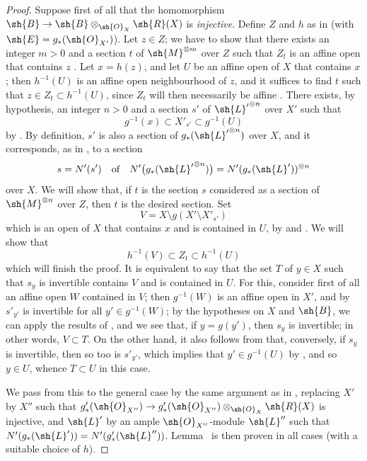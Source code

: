 \begin{proof}
Suppose first of all that the homomorphism $\sh{B}\to\sh{B}\otimes_{\sh{O}_X}\sh{R}(X)$ is \emph{injective}.
Define $Z$ and $h$ as in  (with $\sh{E}=g_*(\sh{O}_{X'})$).
Let $z\in Z$;
we have to show that there exists an integer $m>0$ and a section $t$ of $\sh{M}^{\otimes m}$ over $Z$ such that $Z_t$ is an affine open that contains $z$ .
Let $x=h(z)$, and let $U$ be an affine open of $X$ that contains $x$;
then $h^{-1}(U)$ is an affine open neighbourhood of $z$, and it suffices to find $t$ such that $z\in Z_t\subset h^{-1}(U)$, since $Z_t$ will then necessarily be affine .
There exists, by hypothesis, an integer $n>0$ and a section $s'$ of ${\sh{L}'}^{\otimes n}$ over $X'$ such that
\[
\label{II.6.6.9.1}
  g^{-1}(x) \subset X'_{s'} \subset g^{-1}(U)
\tag{6.6.9.1}
\]
by .
By definition, $s'$ is also a section of $g_*({\sh{L}'}^{\otimes n})$ over $X$, and it corresponds, as in , to a section
\[
  s=N'(s')
  \quad\text{of}\quad
  N'\bigl(g_*({\sh{L}'}^{\otimes n})\bigr)
  =N'(g_*(\sh{L}'))^{\otimes n}
\]
over $X$.
We will show that, if $t$ is the section $s$ considered as a section of $\sh{M}^{\otimes n}$ over $Z$, then $t$ is the desired section.
Set
\[
\label{II.6.6.9.2}
  V = X\setminus g(X'\setminus X'_{s'})
\tag{6.6.9.2}
\]
which is an open of $X$ that contains $x$ and is contained in $U$, by  and .
We will show that
\[
\label{II.6.6.9.3}
  h^{-1}(V) \subset Z_t \subset h^{-1}(U)
\tag{6.6.9.3}
\]
which will finish the proof.
It is equivalent to say that the set $T$ of $y\in X$ such that $s_y$ is invertible contains $V$ and is contained in $U$.
For this, consider first of all an affine open $W$ contained in $V$;
then $g^{-1}(W)$ is an affine open in $X'$, and by  $s'_{y'}$ is invertible for all $y'\in g^{-1}(W)$;
by the hypotheses on $X$ and $\sh{B}$, we can apply the results of , and we see that, if $y=g(y')$, then $s_y$ is invertible;
in other words, $V\subset T$.
On the other hand, it also follows from  that, conversely, if $s_y$ is invertible, then so too is $s'_{y'}$, which implies that $y'\in g^{-1}(U)$ by , and so $y\in U$, whence $T\subset U$ in this case.

We pass from this to the general case by the same argument as in , replacing $X'$ by $X''$ such that $g'_*(\sh{O}_{X''})\to g'_*(\sh{O}_{X''})\otimes_{\sh{O}_X}\sh{R}(X)$ is injective, and $\sh{L}'$ by an ample $\sh{O}_{X''}$-module $\sh{L}''$ such that $N'(g_*(\sh{L}'))=N'(g'_*(\sh{L}''))$.
Lemma~ is then proven in all cases (with a suitable choice of $h$).
\end{proof}

